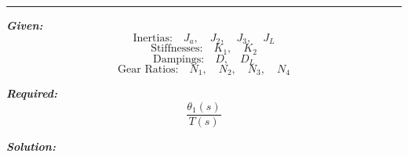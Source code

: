 \documentclass[11pt]{article}
\begin{document}
\noindent\rule{\textwidth}{1pt}

\vspace{12pt}


\noindent\textbf{\textit{Given:}}
\[
\text{Inertias:} \quad J_a, \quad J_2, \quad J_3, \quad J_L
\]
\[
\text{Stiffnesses:} \quad K_1, \quad K_2
\]
\[
\text{Dampings:} \quad D, \quad D_L
\]
\[
\text{Gear Ratios:} \quad N_1, \quad N_2, \quad N_3, \quad N_4
\]

\vspace{1em}
\noindent

\noindent\textbf{\textit{Required:}}
\[
\frac{\theta_1(s)}{T(s)}
\]

\vspace{1.5em}
\noindent\textbf{\textit{Solution:}}



\begin{figure}[!ht]
\centering
{}
\end{figure}
\end{document}
